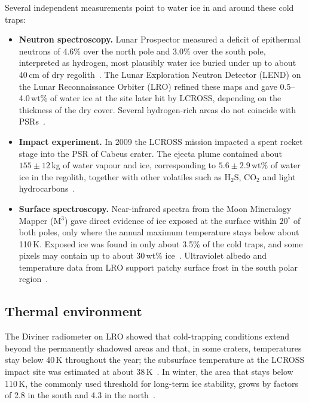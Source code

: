 Several independent measurements point to water ice in and around these cold traps:
\begin{itemize}
    \item \textbf{Neutron spectroscopy.} Lunar Prospector measured a deficit of epithermal neutrons of 4.6\% over the north pole and 3.0\% over the south pole, interpreted as hydrogen, most plausibly water ice buried under up to about 40\,cm of dry regolith~\cite{feldman1998,feldman2001}. The Lunar Exploration Neutron Detector (LEND) on the Lunar Reconnaissance Orbiter (LRO) refined these maps and gave 0.5--4.0\,wt\% of water ice at the site later hit by LCROSS, depending on the thickness of the dry cover. Several hydrogen-rich areas do not coincide with PSRs~\cite{mitrofanov2010}.
    \item \textbf{Impact experiment.} In 2009 the LCROSS mission impacted a spent rocket stage into the PSR of Cabeus crater. The ejecta plume contained about $155\pm12$\,kg of water vapour and ice, corresponding to $5.6\pm2.9$\,wt\% of water ice in the regolith, together with other volatiles such as H$_2$S, CO$_2$ and light hydrocarbons~\cite{colaprete2010}.
    \item \textbf{Surface spectroscopy.} Near-infrared spectra from the Moon Mineralogy Mapper (M$^3$) gave direct evidence of ice exposed at the surface within $20^\circ$ of both poles, only where the annual maximum temperature stays below about 110\,K. Exposed ice was found in only about 3.5\% of the cold traps, and some pixels may contain up to about 30\,wt\% ice~\cite{li2018}. Ultraviolet albedo and temperature data from LRO support patchy surface frost in the south polar region~\cite{hayne2015}.
\end{itemize}

\subsection{Thermal environment}

The Diviner radiometer on LRO showed that cold-trapping conditions extend beyond the permanently shadowed areas and that, in some craters, temperatures stay below 40\,K throughout the year; the subsurface temperature at the LCROSS impact site was estimated at about 38\,K~\cite{paige2010}. In winter, the area that stays below 110\,K, the commonly used threshold for long-term ice stability, grows by factors of 2.8 in the south and 4.3 in the north~\cite{williams2019}.

